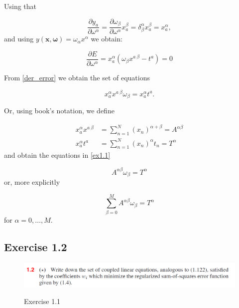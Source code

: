 \documentclass[11pt]{article}
\def\bo{\boldsymbol{\omega}}
\begin{document}
Using that 

\begin{equation}
    \frac{\partial y_{a}}{\partial \omega^{\alpha}} = \frac{\partial \omega_{\beta}}{\partial \omega^{\alpha}} x^{\beta}_{a} = \delta_{\beta}^{\alpha} x^{\beta}_{a} = x^{\alpha}_{a},
\end{equation}
and using $y(\boldsymbol{x}, \bo) = \omega_{\alpha} x^{\alpha}$ we obtain:

\begin{equation}\label{der_error}
    \frac{\partial E}{\partial \omega^{\alpha}} = x^{\alpha}_{a} \left( \omega_{\beta} x^{a \ \beta} - t^{a} \right) = 0
\end{equation}

From \eqref{der_error} we obtain the set of equations

\begin{equation}\label{lin_eq_ss}\boxed{
    x^{\alpha}_{a} x^{a \ \beta} \omega_{\beta} =  x^{\alpha}_{a} t^{a}}.
\end{equation}


Or, using book's notation, we define

\begin{align}
    x_{a}^{\alpha} x^{a \ \beta} &= \sum_{n=1}^{N} (x_{n})^{\alpha + \beta} = A^{\alpha \beta} \\
     x_{a}^{\alpha} t^{a} &= \sum_{n=1}^{N} (x_{n})^{\alpha} t_{n} = T^{\alpha}
\end{align}
 and obtain the equations in \ref{ex1.1}
 
 \begin{equation}
     A^{\alpha \beta} \omega_{\beta} = T^{\alpha} 
 \end{equation}
or, more explicitly

\begin{equation}\boxed{
    \sum_{\beta = 0}^{M} A^{\alpha \beta} \omega_{\beta} = T^{\alpha}}
\end{equation}
for $\alpha = 0, \dots, M$.

\subsection{Exercise 1.2}

\begin{figure}[H]
\centering
        {\includegraphics[width=\linewidth]{ex2.png}}
        \caption{Exercise 1.1}\label{ex1.2}
        \label{ex1.2}
\end{figure}
\end{document}
